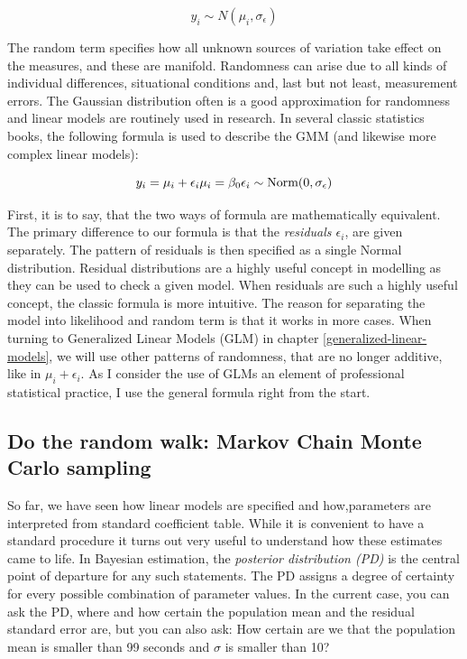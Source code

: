 \documentclass[]{svmono}
\theoremstyle{definition}
\theoremstyle{definition}
\theoremstyle{definition}
\theoremstyle{remark}
\begin{document}
\[y_i \sim N(\mu_i, \sigma_{\epsilon})\]

The random term specifies how all unknown sources of variation take
effect on the measures, and these are manifold. Randomness can arise due
to all kinds of individual differences, situational conditions and, last
but not least, measurement errors. The Gaussian distribution often is a
good approximation for randomness and linear models are routinely used
in research. In several classic statistics books, the following formula
is used to describe the GMM (and likewise more complex linear models):

\[
y_i = \mu_i + \epsilon_i\\
\mu_i = \beta_0\\
\epsilon_i \sim \textrm{Norm}(0, \sigma_\epsilon)
\]

First, it is to say, that the two ways of formula are mathematically
equivalent. The primary difference to our formula is that the
\emph{residuals \(\epsilon_i\)}, are given separately. The pattern of
residuals is then specified as a single Normal distribution. Residual
distributions are a highly useful concept in modelling as they can be
used to check a given model. When residuals are such a highly useful
concept, the classic formula is more intuitive. The reason for
separating the model into likelihood and random term is that it works in
more cases. When turning to Generalized Linear Models (GLM) in chapter
\ref{generalized-linear-models}, we will use other patterns of
randomness, that are no longer additive, like in \(\mu_i + \epsilon_i\).
As I consider the use of GLMs an element of professional statistical
practice, I use the general formula right from the start.

\subsection{Do the random walk: Markov Chain Monte Carlo
sampling}\label{random_walk}

So far, we have seen how linear models are specified and how,parameters
are interpreted from standard coefficient table. While it is convenient
to have a standard procedure it turns out very useful to understand how
these estimates came to life. In Bayesian estimation, the
\emph{posterior distribution (PD)} is the central point of departure for
any such statements. The PD assigns a degree of certainty for every
possible combination of parameter values. In the current case, you can
ask the PD, where and how certain the population mean and the residual
standard error are, but you can also ask: How certain are we that the
population mean is smaller than 99 seconds and \(\sigma\) is smaller
than 10?
\end{document}
